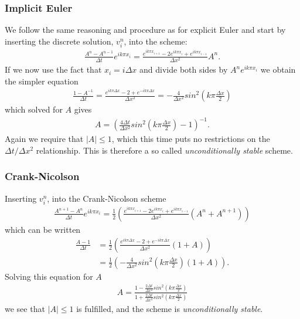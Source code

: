 \documentclass[11pt,a4paper,final]{article}
\numberwithin{equation}{section}
\begin{document}
\subsubsection{Implicit Euler}
\label{sec:implicit_euler}
We follow the same reasoning and procedure as for explicit Euler and start by inserting the discrete solution, $v^n_i$, into the scheme:
\begin{align*}
\frac{A^{n}-A^{n-1}}{\Delta t} e^{ik \pi x_i} = \frac{e^{ik \pi x_{i+1}} -2e^{ik \pi x_i} + e^{ik \pi x_{i-1}}}{\Delta x^2} A^n.
\end{align*}
If we now use the fact that $x_i = i\Delta x$ and divide both sides by $A^n e^{ik \pi x_i}$ we obtain the simpler equation
\begin{align*}
\frac{1-A^{-1}}{\Delta t} = \frac{e^{ik \pi \Delta x} -2 + e^{-ik \pi \Delta x}}{\Delta x^2} = -\frac{4}{\Delta x^2}sin^2\left(k\pi \frac{\Delta x}{2}\right)
\end{align*}
which solved for $A$ gives
\begin{align*}
A=\left( \frac{4\Delta t}{\Delta x^2}sin^2\left(k\pi \frac{\Delta x}{2}\right)-1 \right)^{-1}.
\end{align*}
Again we require that $|A| \leq 1$, which this time puts no restrictions on the $\Delta t/ \Delta x^2$ relationship. This is therefore a so called \emph{unconditionally stable} scheme.


\subsubsection{Crank-Nicolson}
Inserting  $v^n_i$, into the Crank-Nicolson scheme
\begin{align*}
\frac{A^{n+1} - A^{n}}{\Delta t} e^{ik \pi x_i} = \frac{1}{2} \left( \frac{e^{ik \pi x_{i+1}}-2e^{ik \pi x_{i}} + e^{ik \pi x_{i-1}}}{\Delta x^2} (A^n + A^{n+1})  \right)
\end{align*}
which can be written 
\begin{align*}
\frac{A-1}{\Delta t} &= \frac{1}{2} \left( \frac{e^{ik \pi \Delta x} -2 + e^{-ik \pi \Delta x}}{\Delta x^2} (1 + A) \right) \\
&= \frac{1}{2} \left( -\frac{4}{\Delta x^2}sin^2\left(k\pi \frac{\Delta x}{2}\right)(1 + A) \right).
\end{align*}
Solving this equation for $A$
\begin{align*}
A = \frac{1-\frac{2\Delta t}{\Delta x^2}sin^2\left(k\pi \frac{\Delta x}{2}\right)}{1+\frac{2\Delta t}{\Delta x^2}sin^2\left(k\pi \frac{\Delta x}{2}\right)}
\end{align*}
we see that $|A| \leq 1$ is fulfilled, and the scheme is  \emph{unconditionally stable}.
\end{document}
